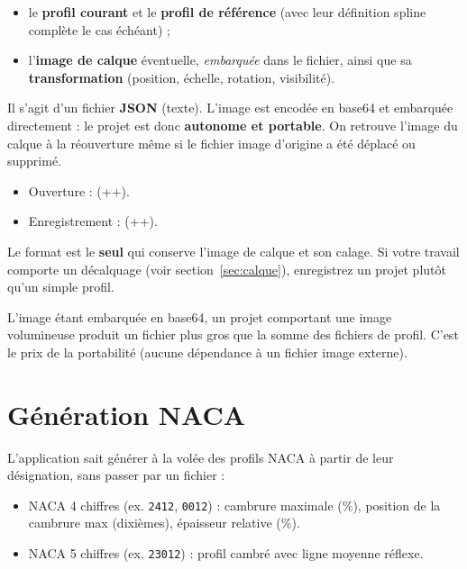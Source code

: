 \begin{itemize}
    \item le \textbf{profil courant} et le \textbf{profil de
        référence} (avec leur définition spline complète le cas
        échéant) ;
    \item l'\textbf{image de calque} éventuelle, \emph{embarquée}
        dans le fichier, ainsi que sa \textbf{transformation}
        (position, échelle, rotation, visibilité).
\end{itemize}

Il s'agit d'un fichier \textbf{JSON} (texte). L'image est encodée
en base64 et embarquée directement : le projet est donc
\textbf{autonome et portable}. On retrouve l'image du calque à la
réouverture même si le fichier image d'origine a été déplacé ou
supprimé.

\begin{itemize}
    \item Ouverture : 
        (++).
    \item Enregistrement :  (++).
\end{itemize}

\begin{important}
Le format  est le \textbf{seul} qui conserve
l'image de calque et son calage. Si votre travail comporte un
décalquage (voir section~\ref{sec:calque}), enregistrez un projet
plutôt qu'un simple profil.
\end{important}

\begin{noteinfo}
L'image étant embarquée en base64, un projet comportant une image
volumineuse produit un fichier  plus gros que la
somme des fichiers de profil. C'est le prix de la portabilité
(aucune dépendance à un fichier image externe).
\end{noteinfo}

\section{Génération NACA}

L'application sait générer à la volée des profils NACA à partir
de leur désignation, sans passer par un fichier :

\begin{itemize}
    \item NACA 4 chiffres (ex. \texttt{2412}, \texttt{0012}) :
        cambrure maximale (\%), position de la cambrure max
        (dixièmes), épaisseur relative (\%).
    \item NACA 5 chiffres (ex. \texttt{23012}) : profil cambré
        avec ligne moyenne réflexe.
\end{itemize}

